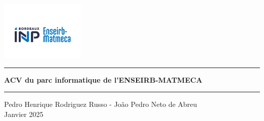 \begin{center}
  \includegraphics[width=0.3\textwidth]{images/logo.png}
  
  \noindent\rule{\textwidth}{1pt}
  
  \vspace{1cm}
  
  {\LARGE\bfseries ACV du parc informatique de l’ENSEIRB-MATMECA}
  
  \vspace{0.5cm}
  \noindent\rule{\textwidth}{1pt} 
  \vspace{1cm}
  
  {\large Pedro Henrique Rodriguez Russo - Jo\~ao Pedro Neto de Abreu} \\
  \vspace{0.3cm}
         {\normalsize Janvier 2025}
\end{center}